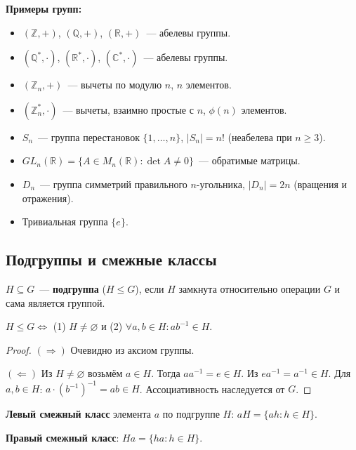 \documentclass[12pt]{article}
\begin{document}
	\textbf{Примеры групп:}
	\begin{itemize}
		\item $(\mathbb{Z}, +)$, $(\mathbb{Q}, +)$, $(\mathbb{R}, +)$~--- абелевы группы.
		\item $(\mathbb{Q}^*, \cdot)$, $(\mathbb{R}^*, \cdot)$, $(\mathbb{C}^*, \cdot)$~--- абелевы группы.
		\item $(\mathbb{Z}_n, +)$~--- вычеты по модулю $n$, $n$ элементов.
		\item $(\mathbb{Z}_n^*, \cdot)$~--- вычеты, взаимно простые с $n$, $\phi(n)$ элементов.
		\item $S_n$~--- группа перестановок $\{1, \dots, n\}$, $|S_n| = n!$ (неабелева при $n \geqslant 3$).
		\item $GL_n(\mathbb{R}) = \{A \in M_n(\mathbb{R}) : \det A \neq 0\}$~--- обратимые матрицы.
		\item $D_n$~--- группа симметрий правильного $n$-угольника, $|D_n| = 2n$ (вращения и отражения).
		\item Тривиальная группа $\{e\}$.
	\end{itemize}
	
	\subsection{Подгруппы и смежные классы}
	
	\begin{definition}
		$H \subseteq G$~--- \textbf{подгруппа} ($H \leqslant G$), если $H$ замкнута относительно операции $G$ и сама является группой.
	\end{definition}
	
	\begin{theorem}
		$H \leqslant G \Leftrightarrow$ (1) $H \neq \varnothing$ и (2) $\forall a, b \in H: ab^{-1} \in H$.
	\end{theorem}
	
	\begin{proof}
		$(\Rightarrow)$ Очевидно из аксиом группы.
		
		$(\Leftarrow)$ Из $H \neq \varnothing$ возьмём $a \in H$. Тогда $aa^{-1} = e \in H$. Из $ea^{-1} = a^{-1} \in H$. Для $a, b \in H$: $a \cdot (b^{-1})^{-1} = ab \in H$.
		Ассоциативность наследуется от $G$.
	\end{proof}
	
	\begin{definition}
		\textbf{Левый смежный класс} элемента $a$ по подгруппе $H$: $aH = \{ah : h \in H\}$.
		
		\textbf{Правый смежный класс}: $Ha = \{ha : h \in H\}$.
	\end{definition}
	
\end{document}
